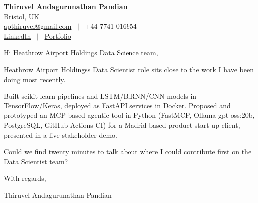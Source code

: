 \documentclass[11pt,a4paper]{article}
\begin{document}
\raggedright
\pagestyle{empty}

\begin{center}
    {\LARGE \color{linkblue} \textbf{Thiruvel Andagurunathan Pandian}}\\[0.2cm]
    Bristol, UK \\
    \href{mailto:apthiruvel@gmail.com}{apthiruvel@gmail.com} \ $|$ \ +44 7741 016954 \\
\href{https://www.linkedin.com/in/thiruvel-a-p/}{LinkedIn} \ $|$ \ \href{https://thiruvel-ap.github.io/PersonalPortfolio/}{Portfolio}
\end{center}

\vspace{0.4cm}

\noindent
Hi Heathrow Airport Holdings Data Science team,

Heathrow Airport Holdings\textquotesingle{}s Data Scientist role sits close to the work I have been doing most recently.

Built scikit-learn pipelines and LSTM/BiRNN/CNN models in TensorFlow/Keras, deployed as FastAPI services in Docker. Proposed and prototyped an MCP-based agentic tool in Python (FastMCP, Ollama gpt-oss:20b, PostgreSQL, GitHub Actions CI) for a Madrid-based product start-up client, presented in a live stakeholder demo.

Could we find twenty minutes to talk about where I could contribute first on the Data Scientist team?

\vspace{0.5cm}

With regards,

Thiruvel Andagurunathan Pandian
\end{document}
